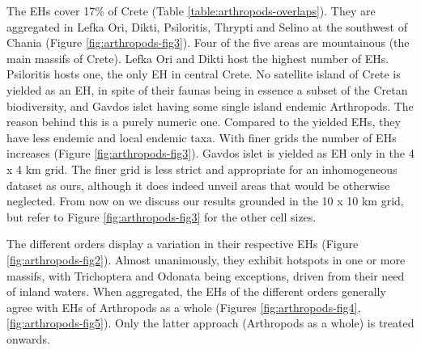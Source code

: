     The EHs cover 17\% of Crete (Table \ref{table:arthropods-overlaps}). They are aggregated in Lefka Ori, Dikti,
Psiloritis, Thrypti and Selino at the southwest of Chania (Figure \ref{fig:arthropods-fig3}).
Four of the five areas are mountainous (the main massifs of Crete). Lefka Ori
and Dikti host the highest number of EHs. Psiloritis hosts one, the only EH in
central Crete. No satellite island of Crete is yielded as an EH, in spite of
their faunas being in essence a subset of the Cretan biodiversity, and Gavdos
islet having some single island endemic Arthropods. The reason behind this is a
purely numeric one. Compared to the yielded EHs, they have less endemic and local
endemic taxa. With finer grids the number of EHs increases (Figure \ref{fig:arthropods-fig3}). Gavdos
islet is yielded as EH only in the 4 x 4 km grid. The finer grid is less strict
and appropriate for an inhomogeneous dataset as ours, although it does indeed
unveil areas that would be otherwise neglected. From now on we discuss our
results grounded in the 10 x 10 km grid, but refer to Figure \ref{fig:arthropods-fig3} for the other
cell sizes.

The different orders display a variation in their respective EHs (Figure \ref{fig:arthropods-fig2}).
Almost unanimously, they exhibit hotspots in one or more massifs,
with Trichoptera and Odonata being exceptions, driven from their need of inland waters.
When aggregated, the EHs of the different orders generally agree with EHs of
Arthropods as a whole (Figures \ref{fig:arthropods-fig4}, \ref{fig:arthropods-fig5}). Only the
latter approach (Arthropods as a whole) is treated onwards.

